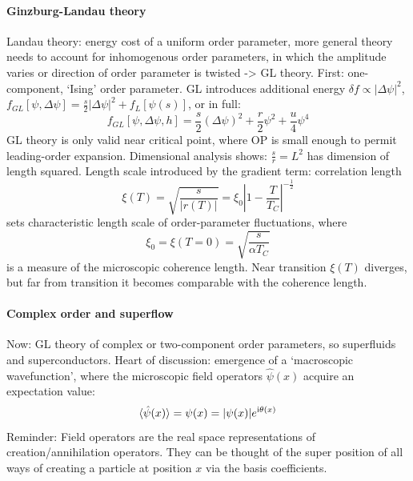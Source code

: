 \documentclass[../notes.tex]{subfiles}
\begin{document}
\paragraph{Ginzburg-Landau theory}

Landau theory: energy cost of a uniform order parameter, more general theory needs to account for inhomogenous order parameters, in which the amplitude varies or direction of order parameter is twisted -> GL theory.
First: one-component, `Ising' order parameter.
GL introduces additional energy \(\delta f \propto \vert \Delta \psi \vert^2\), \(f_{GL} [\psi, \Delta \psi] = \frac{s}{2} \vert \Delta \psi \vert^2 + f_L [\psi(s)]\), or in full:
\begin{equation}
	f_{GL} [\psi, \Delta \psi, h] = \frac{s}{2} (\Delta \psi)^2 + \frac{r}{2} \psi^2 + \frac{u}{4} \psi^4
\end{equation}
GL theory is only valid near critical point, where OP is small enough to permit leading-order expansion.
Dimensional analysis shows: \(\frac{s}{r} = L^2\) has dimension of length squared.
Length scale introduced by the gradient term: correlation length
\begin{equation}
	\xi (T) = \sqrt{\frac{s}{\vert r(T) \vert}} = \xi_0 \left\vert 1 - \frac{T}{T_C} \right\vert^{-\frac{1}{2}}
\end{equation}
sets characteristic length scale of order-parameter fluctuations, where
\begin{equation}
	\xi_0 = \xi (T = 0) = \sqrt{\frac{s}{\alpha T_C}}
\end{equation}
is a measure of the microscopic coherence length.
Near transition \(\xi (T)\) diverges, but far from transition it becomes comparable with the coherence length.

\paragraph{Complex order and superflow}

Now: GL theory of complex or two-component order parameters, so superfluids and superconductors.
Heart of discussion: emergence of a `macroscopic wavefunction', where the microscopic field operators \(\hat{\psi}(x)\) acquire an expectation value:
\begin{equation}
	\braket{\hat{\psi} (x)} = \psi (x) = \vert \psi (x) \vert e^{\mathrm{i} \theta(x)}
\end{equation}
Reminder: Field operators are the real space representations of creation/annihilation operators.
They can be thought of the super position of all ways of creating a particle at position \(x\) via the basis coefficients.
\end{document}
